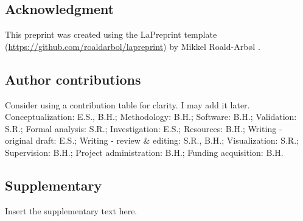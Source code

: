 \subsection{Acknowledgment}
This preprint was created using the LaPreprint template (\url{https://github.com/roaldarbol/lapreprint}) by Mikkel Roald-Arb\o l \textsuperscript{}.

\subsection{Author contributions}
Consider using a contribution table for clarity. I may add it later.
Conceptualization: E.S., B.H.; Methodology: B.H.; Software: B.H.; Validation: S.R.; Formal analysis: S.R.; Investigation: E.S.; Resources: B.H.; Writing - original draft: E.S.; Writing - review \& editing: S.R., B.H.; Visualization: S.R.; Supervision: B.H.; Project administration: B.H.; Funding acquisition: B.H.

\subsection{Supplementary}
Insert the supplementary text here.
